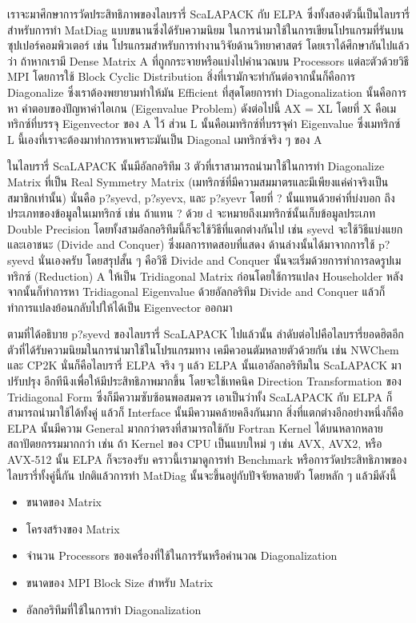 เราจะมาศึกษาการวัดประสิทธิภาพของไลบรารี่ ScaLAPACK กับ ELPA ซึ่งทั้งสองตัวนี้เป็นไลบรารี่สำหรับการทำ MatDiag แบบขนานซึ่งได้รับความนิยม%
ในการนำมาใช้ในการเขียนโปรแกรมที่รันบนซุปเปอร์คอมพิวเตอร์ เช่น โปรแกรมสำหรับการทำงานวิจัยด้านวิทยาศาสตร์ โดยเราได้ศึกษากันไปแล้วว่า%
ถ้าหากเรามี Dense Matrix A ที่ถูกกระจายหรือแบ่งไปคำนวณบน Processors แต่ละตัวด้วยวิธี MPI โดยการใช้ Block Cyclic Distribution
สิ่งที่เรามักจะทำกันต่อจากนั้นก็คือการ Diagonalize ซึ่งเราต้องพยายามทำให้มัน Efficient ที่สุดโดยการทำ Diagonalization นั้นคือการหา%
คำตอบของปัญหาค่าไอเกน (Eigenvalue Problem) ดังต่อไปนี้ AX = XL โดยที่ X คือเมทริกซ์ที่บรรจุ Eigenvector ของ A ไว้ ส่วน L
นั้นคือเมทริกซ์ที่บรรจุค่า Eigenvalue ซึ่งเมทริกซ์ L นี้เองที่เราจะต้องมาทำการหาเพราะมันเป็น Diagonal เมทริกซ์จริง ๆ ของ A

ในไลบรารี่ ScaLAPACK นั้นมีอัลกอริทึม 3 ตัวที่เราสามารถนำมาใช้ในการทำ Diagonalize Matrix ที่เป็น Real Symmetry Matrix
(เมทริกซ์ที่มีความสมมาตรและมีเพียงแค่ค่าจริงเป็นสมาชิกเท่านั้น) นั่นคือ p?syevd, p?syevx, และ p?syevr โดยที่ ? นั้นแทนด้วยค่าที่บ่งบอก%
ถึงประเภทของข้อมูลในเมทริกซ์ เช่น ถ้าแทน ? ด้วย d จะหมายถึงเมทริกซ์นั้นเก็บข้อมูลประเภท Double Precision
โดยทั้งสามอัลกอริทึมนี้ก็จะใช้วิธีที่แตกต่างกันไป เช่น syevd จะใช้วิธีแบ่งแยกและเอาชนะ (Divide and Conquer) ซึ่งผลการทดสอบที่แสดง%
ด้านล่างนั้นได้มาจากการใช้ p?syevd นั่นเองครับ โดยสรุปสั้น ๆ คือวิธี Divide and Conquer นั้นจะเริ่มด้วยการทำการลดรูปเมทริกซ์ (Reduction)
A ให้เป็น Tridiagonal Matrix ก่อนโดยใช้การแปลง Householder หลังจากนั้นก็ทำการหา Tridiagonal Eigenvalue ด้วยอัลกอริทึม
Divide and Conquer แล้วก็ทำการแปลงย้อนกลับไปให้ได้เป็น Eigenvector ออกมา

ตามที่ได้อธิบาย p?syevd ของไลบรารี่ ScaLAPACK ไปแล้วนั้น ลำดับต่อไปคือไลบรารี่ยอดฮิตอีกตัวที่ได้รับความนิยมในการนำมาใช้ในโปรแกรมทาง%
เคมีควอนตัมหลายตัวด้วยกัน เช่น NWChem และ CP2K นั่นก็คือไลบรารี่ ELPA จริง ๆ แล้ว ELPA นั้นเอาอัลกอริทึมใน ScaLAPACK มาปรับปรุง%
อีกทีนึงเพื่อให้มีประสิทธิภาพมากขึ้น โดยจะใช้เทคนิค Direction Transformation ของ Tridiagonal Form ซึ่งก็มีความซับซ้อนพอสมควร
เอาเป็นว่าทั้ง ScaLAPACK กับ ELPA ก็สามารถนำมาใช้ได้ทั้งคู่ แล้วก็ Interface นั้นมีความคล้ายคลึงกันมาก สิ่งที่แตกต่างอีกอย่างหนึ่งก็คือ ELPA
นั้นมีความ General มากกว่าตรงที่สามารถใช้กับ Fortran Kernel ได้บนหลากหลายสถาปัตยกรรมมากกว่า เช่น ถ้า Kernel ของ CPU เป็นแบบใหม่ ๆ
เช่น AVX, AVX2, หรือ AVX-512 นั้น ELPA ก็จะรองรับ คราวนี้เรามาดูการทำ Benchmark หรือการวัดประสิทธิภาพของไลบรารี่ทั้งคู่นี้กัน
ปกติแล้วการทำ MatDiag นั้นจะขึ้นอยู่กับปัจจัยหลายตัว โดยหลัก ๆ แล้วมีดังนี้

\begin{itemize}[topsep=0pt,noitemsep]
  \setlength\itemsep{1em}
  \item ขนาดของ Matrix

  \item โครงสร้างของ Matrix

  \item จำนวน Processors ของเครื่องที่ใช้ในการรันหรือคำนวณ Diagonalization

  \item ขนาดของ MPI Block Size สำหรับ Matrix

  \item อัลกอริทึมที่ใช้ในการทำ Diagonalization
\end{itemize}

